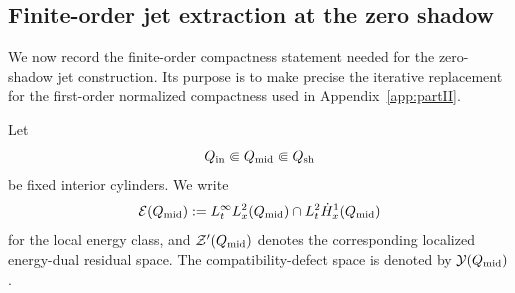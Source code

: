 \documentclass[11pt]{article}
\numberwithin{equation}{section}
\theoremstyle{plain}
\theoremstyle{definition}
\theoremstyle{remark}
\newcommand{\calE}{\mathcal E}
\newcommand{\calY}{\mathcal Y}
\newcommand{\calZ}{\mathcal Z}
\begin{document}
\subsection{Finite-order jet extraction at the zero shadow}\label{pIII:sec:jet-extraction}

We now record the finite-order compactness statement needed for the zero-shadow jet construction.
Its purpose is to make precise the iterative replacement for the first-order normalized
compactness used in Appendix~\ref{app:partII}.

Let
\[
        Q_{\rm in}\Subset Q_{\rm mid}\Subset Q_{\rm sh}
\]
be fixed interior cylinders.  We write
\[
        \calE(Q_{\rm mid})
        :=
        L^\infty_tL^2_x(Q_{\rm mid})
        \cap
        L^2_t\dot H^1_x(Q_{\rm mid})
\]
for the local energy class, and \(\calZ'(Q_{\rm mid})\) denotes the corresponding
localized energy-dual residual space.  The compatibility-defect space is denoted by
\(\calY(Q_{\rm mid})\).
\end{document}
